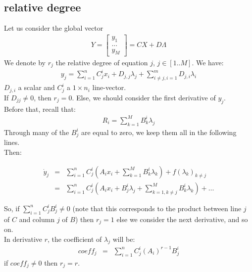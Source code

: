 \documentclass[10pt]{report}
\begin{document}
\subsection{relative degree}
Let us consider the global vector 
\begin{eqnarray}
Y =\left[\begin{array}{c} 
y_1 \\
...  \\
y_M
\end{array}\right] = CX + D\Lambda
\end{eqnarray}
We denote by $r_j$ the relative degree of equation $j$, $j\in [1..M]$. 
We have:
\begin{eqnarray}
y_j = \displaystyle{\sum_{i=1}^n C_j^i x_i +D_{j,j}\lambda_j + \sum_{i\neq j, i=1}^m D_{j,i} \lambda_i } 
\end{eqnarray}
$D_{j,i}$ a scalar and $C_j^i$ a $1 \times n_i$ line-vector. \\
If $D_{jj} \neq 0$, then $r_j=0$. Else, we should consider the first derivative of $y_j$. \\
Before that, recall that: 
\begin{eqnarray}
R_i = \displaystyle{\sum_{k=1}^M B_k^i \lambda_j}
\end{eqnarray}
Through many of the $B_j^i$ are equal to zero, we keep them all in the following lines. \\
Then:

\begin{eqnarray}
\dot y_j &=& \displaystyle{\sum_{i=1}^n C_j^i (A_i x_i +  \sum_{k=1}^M B_k^i \lambda_k  ) + f(\lambda_k)_{k\neq j}} \\
&=& \displaystyle{\sum_{i=1}^n C_j^i (A_i x_i + B_j^i \lambda_j + \sum_{k=1,k\neq j}^M B_k^i \lambda_k  ) + \ldots}
\end{eqnarray}

So, if $\displaystyle{\sum_{i=1}^n C_j^i B_j^i} \neq 0$ (note that this corresponds to the product between line $j$ of $C$ and column $j$ of $B$) 
then $r_j=1$ else we consider the next derivative, and so on.  \\
In derivative $r$, the coefficient of $\lambda_j$ will be:
\begin{eqnarray}
coeff_j&=& \displaystyle{\sum_{i=1}^n C_j^i (A_i)^{r-1} B_j^i }
\end{eqnarray}
if $coeff_j\neq 0$ then $r_j = r$. 
\end{document}
